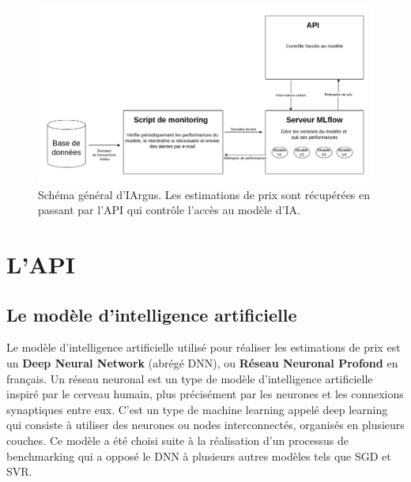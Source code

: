\documentclass[french]{article}
\begin{document}
    \begin{figure}[h!]
        \includegraphics[width=12cm]{architecture_E3}
        \centering
        \caption{Schéma général d'IArgus. Les estimations de prix sont récupérées en passant par l'API qui contrôle l'accès au modèle d'IA.}
        \centering
    \end{figure}

    \section{L'API}
    \subsection{Le modèle d'intelligence artificielle}
    Le modèle d'intelligence artificielle utilisé pour réaliser les estimations de prix est un \textbf{Deep Neural Network} (abrégé DNN), ou \textbf{Réseau Neuronal Profond} en français. Un réseau neuronal est un type de modèle d'intelligence artificielle inspiré par le cerveau humain, plus précisément par les neurones et les connexions synaptiques entre eux. C'est un type de machine learning appelé deep learning qui consiste à utiliser des neurones ou nodes interconnectés, organisés en plusieurs couches. Ce modèle a été choisi suite à la réalisation d'un processus de benchmarking qui a opposé le DNN à plusieurs autres modèles tels que SGD et SVR.
\end{document}
